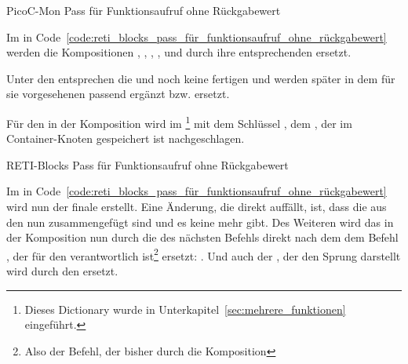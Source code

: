 \begin{code}
  \centering
  \caption{PicoC-Mon Pass für Funktionsaufruf ohne Rückgabewert}
  \label{code:picoc_mon_pass_für_funktionsaufruf_ohne_rückgabewert}
\end{code}

Im  in Code~\ref{code:reti_blocks_pass_für_funktionsaufruf_ohne_rückgabewert} werden die Kompositionen , , , ,  und  durch ihre entsprechenden  ersetzt.

Unter den  entsprechen die   und  noch keine fertigen  und werden später in dem für sie vorgesehenen  passend ergänzt bzw. ersetzt.

Für den    in der Komposition  wird im  \footnote{Dieses Dictionary wurde in Unterkapitel~\ref{sec:mehrere_funktionen} eingeführt.} mit dem Schlüssel , dem , der im Container-Knoten  gespeichert ist nachgeschlagen.

\begin{code}
  \centering
  \caption{RETI-Blocks Pass für Funktionsaufruf ohne Rückgabewert}
  \label{code:reti_blocks_pass_für_funktionsaufruf_ohne_rückgabewert}
\end{code}

Im  in Code~\ref{code:reti_blocks_pass_für_funktionsaufruf_ohne_rückgabewert} wird nun der finale  erstellt. Eine Änderung, die direkt auffällt, ist, dass die  aus den  nun zusammengefügt sind und es keine  mehr gibt. Des Weiteren wird das  in der Komposition  nun durch die  des nächsten Befehls direkt nach dem dem Befehl , der für den  verantwortlich ist\footnote{Also der Befehl, der bisher durch die Komposition } ersetzt: . Und auch der , der den Sprung  darstellt wird durch den   ersetzt.

